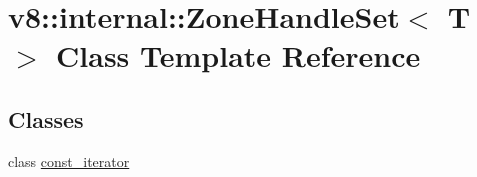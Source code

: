 \hypertarget{classv8_1_1internal_1_1ZoneHandleSet}{}\section{v8\+:\+:internal\+:\+:Zone\+Handle\+Set$<$ T $>$ Class Template Reference}
\label{classv8_1_1internal_1_1ZoneHandleSet}
\subsection*{Classes}
\begin{DoxyCompactItemize}
\item 
class \mbox{\hyperlink{classv8_1_1internal_1_1ZoneHandleSet_1_1const__iterator}{const\+\_\+iterator}}
\end{DoxyCompactItemize}
